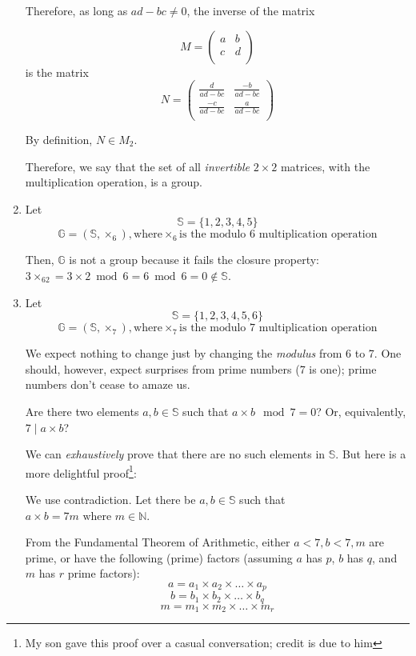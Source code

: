 \documentclass[english,notitlepage,smartquotes]{hgbreport}
\theoremstyle{definition}
\theoremstyle{definition}
\theoremstyle{remark}
\theoremstyle{definition}
\theoremstyle{plain}
\theoremstyle{definition}
\begin{document}
\begin{enumerate}
Therefore, as long as $ad-bc\ne0$, the inverse of the matrix 

$$
  M=\begin{pmatrix}
    a & b\\
    c & d\\
  \end{pmatrix}
$$
is the matrix
$$
  N=\begin{pmatrix}
    \frac{d}{ad-bc} & \frac{-b}{ad-bc}\\
    \frac{-c}{ad-bc} & \frac{a}{ad-bc}\\
  \end{pmatrix}
$$

By definition, $N\in M_2$.

Therefore, we say that the set of all \emph{invertible} $2\times 2$ matrices, with the multiplication operation, is a group.

\item Let 
$$
\mathbb{S}=\{1,2,3,4,5\}
$$
$$
\mathbb{G}=(\mathbb{S},\times_6), \text{where} \times_6 \text{is the modulo 6 multiplication operation}
$$

Then, $\mathbb{G}$ is not a group because it fails the closure property: $3\times_62=3\times2\bmod 6=6\bmod 6=0\not\in\mathbb{S}$.

\item\label{item:multmod7} Let 
$$
\mathbb{S}=\{1,2,3,4,5,6\}
$$
$$
\mathbb{G}=(\mathbb{S},\times_7), \text{where} \times_7 \text{is the modulo 7 multiplication operation}
$$

We expect nothing to change just by changing the \emph{modulus} from 6 to 7. One should, however, expect surprises from prime numbers (7 is one); prime numbers don't cease to amaze us. 

Are there two elements $a,b\in\mathbb{S}$ such that $a\times b \mod 7=0$? Or, equivalently, $7\mid a\times b$? 

We can \emph{exhaustively} prove that there are no such elements in $\mathbb{S}$. But here is a more delightful proof\footnote{My son gave this proof over a casual conversation; credit is due to him}:

We use contradiction. Let there be $a,b\in\mathbb{S}$ such that $a\times b=7m \text{ where } m\in\mathbb{N}$. 

From the Fundamental Theorem of Arithmetic, either $a<7,b<7,m$ are prime, or have the following (prime) factors (assuming $a$ has $p$, $b$ has $q$, and $m$ has $r$ prime factors):
$$
a=a_1\times a_2\times\dots\times a_p
$$
$$
b=b_1\times b_2\times\dots\times b_q
$$
$$
m=m_1\times m_2\times\dots\times m_r
$$


\end{enumerate}
\end{document}
